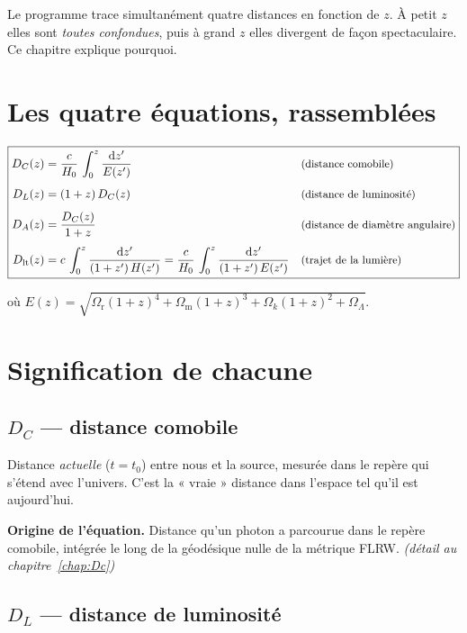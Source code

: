 \documentclass[11pt,a4paper,openany]{report}
\newcommand{\dif}{\mathrm{d}}
\newcommand{\Hzero}{H_{0}}
\newcommand{\Om}{\Omega_{\mathrm{m}}}
\newcommand{\Or}{\Omega_{\mathrm{r}}}
\newcommand{\OL}{\Omega_{\Lambda}}
\newcommand{\Ok}{\Omega_{k}}
\begin{document}
Le programme trace simultanément quatre distances en fonction de $z$. À petit
$z$ elles sont \emph{toutes confondues}, puis à grand $z$ elles divergent
de façon spectaculaire. Ce chapitre explique pourquoi.

\section{Les quatre équations, rassemblées}

\begin{equation}
\label{eq:rassemble}
\boxed{
\begin{aligned}
D_{C}(z)        &= \frac{c}{\Hzero}\,\int_{0}^{z}\frac{\dif z'}{E(z')} &&
\text{\small (distance comobile)} \\[4pt]
D_{L}(z)        &= (1+z)\,D_{C}(z) &&
\text{\small (distance de luminosité)} \\[4pt]
D_{A}(z)        &= \frac{D_{C}(z)}{1+z} &&
\text{\small (distance de diamètre angulaire)} \\[4pt]
D_{\text{lt}}(z) &= c\,\int_{0}^{z}\frac{\dif z'}{(1+z')\,H(z')}
                  = \frac{c}{\Hzero}\,\int_{0}^{z}\frac{\dif z'}{(1+z')\,E(z')} &&
\text{\small (trajet de la lumière)}
\end{aligned}
}
\end{equation}

\noindent où $E(z) = \sqrt{\Or(1+z)^{4} + \Om(1+z)^{3} + \Ok(1+z)^{2} + \OL}$.

\section{Signification de chacune}

\subsection*{$D_{C}$ --- distance comobile}

Distance \emph{actuelle} ($t = t_{0}$) entre nous et la source, mesurée dans le
repère qui s'étend avec l'univers. C'est la « vraie » distance dans l'espace
tel qu'il est aujourd'hui.

\textbf{Origine de l'équation.} Distance qu'un photon a parcourue dans le
repère comobile, intégrée le long de la géodésique nulle de la métrique FLRW.
\hfill\emph{(détail au chapitre~\ref{chap:Dc})}

\subsection*{$D_{L}$ --- distance de luminosité}
\end{document}
